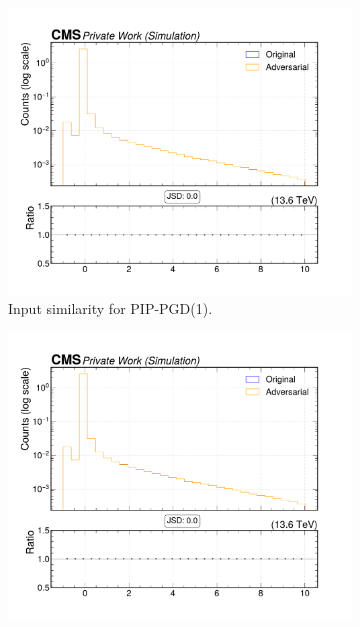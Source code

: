\begin{figure}[htbp]
  \centering
  \begin{subfigure}[t]{0.32\textwidth}
    \includegraphics[width=\linewidth]{media/output/features/compare/combined_it_1/cmp_cpf_arr_Cpfcan_BtagPf_trackSip2dVal.pdf}
    \caption*{Input similarity for PIP-PGD(1).}
  \end{subfigure}\hfill
  \begin{subfigure}[t]{0.32\textwidth}
    \includegraphics[width=\linewidth]{media/output/features/compare/combined_it_2/cmp_cpf_arr_Cpfcan_BtagPf_trackSip2dVal.pdf}

\end{subfigure}
\end{figure}
